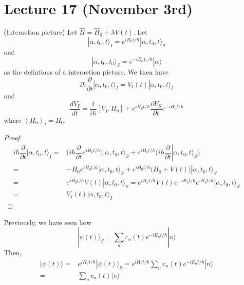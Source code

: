 \section{Lecture 17 (November 3rd)}
\begin{defi}
(Interaction picture) Let $\hat{H}=\hat{H}_{0}+\lambda V(t)$. Let
\[|\alpha,t_{0},t\rangle _{I}=e^{iH_0t/\hbar }|\alpha ,t_0,t\rangle _{S}\]
and
\[|\alpha ,t_0,t_0\rangle _{S}=e^{-iE_{\alpha }t_0/\hbar }|\alpha \rangle \]
as the defintions of a interaction picture. We then have
\[i\hbar \dfrac{\partial }{\partial t}|\alpha ,t_0,t\rangle _{I}=V_{I}(t)|\alpha ,t_0,t\rangle _{I} \]
and
\[\dfrac{d V_{I}}{d t}=\dfrac{1}{i\hbar }[V_{I},H_0]+e^{iH_0t/\hbar }\dfrac{\partial V_{S}}{\partial t}e^{-iH_0t/\hbar }\]
where $(H_0)_{I}=H_0$.
\end{defi}
\vspace{2ex}
\begin{proof}
\[\begin{align*}
i\hbar \dfrac{\partial }{\partial t}|\alpha ,t_0,t\rangle _{I}=&\Big(i\hbar \dfrac{\partial }{\partial t}e^{iH_0t/\hbar } \Big)|\alpha ,t_0,t\rangle _{S}+e^{iH_0t/\hbar }\Big(i\hbar \dfrac{\partial }{\partial t}|\alpha ,t_0,t\rangle _{S} \Big)\\
=&-H_0e^{iH_0t/\hbar }|\alpha ,t_0,t\rangle _{S}+e^{iH_0t/\hbar }\Big(H_0+V(t)\Big)|\alpha ,t_0,t\rangle _{S}\\
=&e^{iH_0t/\hbar }V(t)|\alpha ,t_0,t\rangle _{S}=e^{iH_0t/\hbar }V(t)e^{-iH_0t/\hbar }e^{iH_0t/\hbar }|\alpha ,t_0,t\rangle _{S}\\
=&V_{I}(t)|\alpha ,t_0,t\rangle _{I}
\end{align*}\]
\end{proof}
\vspace{2ex}
\begin{cor}
Previously, we have seen how
\[|\psi (t)\rangle _{S}=\sum _{n}c_{n}(t)e^{-iE_{n}t/\hbar }|n\rangle \]
Then,
\[\begin{align*}
|\psi (t)\rangle =& e^{iH_0t/\hbar }|\psi (t)\rangle _{S}=e^{iH_0t/\hbar }\sum _{n}c_{n}(t)e^{-iE_{n}t/\hbar }|n\rangle \\
=&\sum _{n}c_{n}(t)|n\rangle 
\end{align*}\]
\end{cor}
\vspace{2ex}
